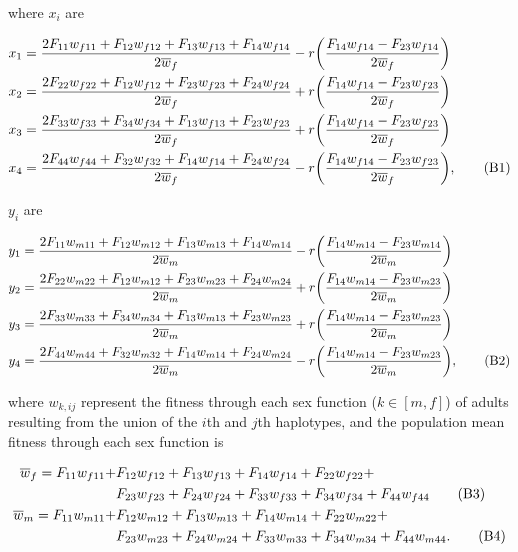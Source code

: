 \documentclass{article}
\newcommand\numberthis{\addtocounter{equation}{1}\tag{\theequation}}
\begin{document}
\noindent{} where $x_{i}$ are

\begin{align*}
	x_1 &= \frac{2 F_{11} w_{f11} + F_{12} w_{f12} + F_{13} w_{f13} + F_{14} w_{f14}}{2 \overline{w}_f} - r \bigg( \frac{F_{14} w_{f14} - F_{23} w_{f14}}{2 \overline{w}_f} \bigg) \\
	x_2 &= \frac{2 F_{22} w_{f22} + F_{12} w_{f12} + F_{23} w_{f23} + F_{24} w_{f24}}{2 \overline{w}_f} + r \bigg( \frac{F_{14} w_{f14} - F_{23} w_{f23}}{2 \overline{w}_f} \bigg) \\
	x_3 &= \frac{2 F_{33} w_{f33} + F_{34} w_{f34} + F_{13} w_{f13} + F_{23} w_{f23}}{2 \overline{w}_f} + r \bigg( \frac{F_{14} w_{f14} - F_{23} w_{f23}}{2 \overline{w}_f} \bigg) \\
	x_4 &= \frac{2 F_{44} w_{f44} + F_{32} w_{f32} + F_{14} w_{f14} + F_{24} w_{f24}}{2 \overline{w}_f} - r \bigg( \frac{F_{14} w_{f14} - F_{23} w_{f23}}{2 \overline{w}_f} \bigg), \numberthis
\end{align*}

\noindent{} $y_{i}$ are

\begin{align*}
	y_1 &= \frac{2 F_{11} w_{m11} + F_{12} w_{m12} + F_{13} w_{m13} + F_{14} w_{m14}}{2 \overline{w}_m} - r \bigg( \frac{F_{14} w_{m14} - F_{23} w_{m14}}{2 \overline{w}_m} \bigg) \\
	y_2 &= \frac{2 F_{22} w_{m22} + F_{12} w_{m12} + F_{23} w_{m23} + F_{24} w_{m24}}{2 \overline{w}_m} + r \bigg( \frac{F_{14} w_{m14} - F_{23} w_{m23}}{2 \overline{w}_m} \bigg) \\
	y_3 &= \frac{2 F_{33} w_{m33} + F_{34} w_{m34} + F_{13} w_{m13} + F_{23} w_{m23}}{2 \overline{w}_m} + r \bigg( \frac{F_{14} w_{m14} - F_{23} w_{m23}}{2 \overline{w}_m} \bigg) \\
	y_4 &= \frac{2 F_{44} w_{m44} + F_{32} w_{m32} + F_{14} w_{m14} + F_{24} w_{m24}}{2 \overline{w}_m} - r \bigg( \frac{F_{14} w_{m14} - F_{23} w_{m23}}{2 \overline{w}_m} \bigg), \numberthis
\end{align*}

\noindent{} where ${w}_{k,ij}$ represent the fitness through each sex function ($k \in [m,f]$) of adults resulting from the union of the $i$th and $j$th haplotypes, and the population mean fitness through each sex function is

\begin{align*}
	\overline{w}_f = F_{11} w_{f11} + &F_{12} w_{f12} + F_{13} w_{f13} + F_{14} w_{f14} + F_{22} w_{f22} + \\ 
				     &F_{23} w_{f23} + F_{24} w_{f24} + F_{33} w_{f33} + F_{34} w_{f34} + F_{44} w_{f44} \numberthis \\
	\overline{w}_m = F_{11} w_{m11} + &F_{12} w_{m12} + F_{13} w_{m13} + F_{14} w_{m14} + F_{22} w_{m22} + \\
				     &F_{23} w_{m23} + F_{24} w_{m24} + F_{33} w_{m33} + F_{34} w_{m34} + F_{44} w_{m44}. \numberthis
\end{align*}
\end{document}
